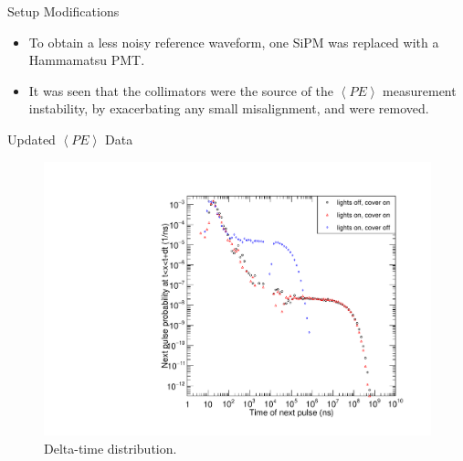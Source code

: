 \documentclass{beamer}
\begin{document}
\begin{frame}{Setup Modifications}
\begin{itemize}
\item To obtain a less noisy reference waveform, one SiPM was replaced with a Hammamatsu PMT.
\item It was seen that the collimators were the source of the $\left< PE \right>$ measurement instability, by exacerbating any small misalignment, and were removed. 
\end{itemize}
\end{frame}

\begin{frame}{Updated $\left< PE \right>$ Data}
\begin{figure}
\centering
\includegraphics[height=0.5\textwidth]{LightLeak.pdf}
\caption{Delta-time distribution.}
\end{figure}
\end{frame}
\end{document}
